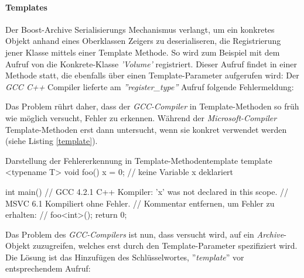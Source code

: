 \paragraph{Templates}
Der Boost-Archive Serialisierungs Mechanismus verlangt, um ein konkretes Objekt anhand eines Oberklassen Zeigers zu deserialiseren, die Registrierung jener Klasse mittels einer Template Methode. So wird zum Beispiel mit dem Aufruf von 
die Konkrete-Klasse \emph{'Volume'} registriert. Dieser Aufruf findet in einer Methode statt, die ebenfalls über einen Template-Parameter aufgerufen wird: 
Der \emph{GCC C++} Compiler lieferte am \emph{''register\_type''} Aufruf folgende Fehlermeldung:
\begin{center}
\end{center}
\NP
Das Problem rührt daher, dass der \emph{GCC-Compiler} in Template-Methoden so früh wie möglich versucht, Fehler zu erkennen. Während der \emph{Microsoft-Compiler} Template-Methoden erst dann untersucht, wenn sie konkret verwendet werden (siehe Listing \ref{template}).  
\begin{code}{Darstellung der Fehlererkennung in Template-Methoden}{template}
template <typename T>
void foo() {
	x = 0; // keine Variable x deklariert
}

int main() {
	// GCC 4.2.1 C++ Kompiler: 'x' was not declared in this scope.
	// MSVC 6.1 Kompiliert ohne Fehler.
	// Kommentar entfernen, um Fehler zu erhalten:
	// foo<int>();
	return 0;
}
\end{code}

Das Problem des \emph{GCC-Compilers} ist nun, dass versucht wird, auf ein \emph{Archive}-Objekt zuzugreifen, welches erst durch den Template-Parameter spezifiziert wird. Die Lösung ist das Hinzufügen des Schlüsselwortes, ''\emph{template}'' vor entsprechendem Aufruf:















